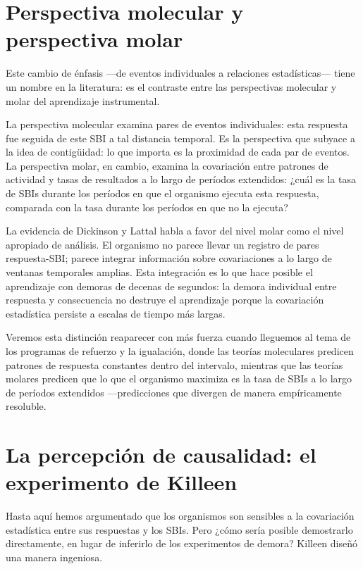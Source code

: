 \documentclass[
  letterpaper,
  DIV=11,
  numbers=noendperiod]{scrreprt}
\begin{document}
\begin{tcolorbox}[enhanced jigsaw, toprule=.15mm, arc=.35mm, colback=white, opacityback=0, colframe=quarto-callout-note-color-frame, breakable, rightrule=.15mm, left=2mm, leftrule=.75mm, bottomrule=.15mm]
\section{Perspectiva molecular y perspectiva
molar}\label{perspectiva-molecular-y-perspectiva-molar}

Este cambio de énfasis ---de eventos individuales a relaciones
estadísticas--- tiene un nombre en la literatura: es el contraste entre
las perspectivas molecular y molar del aprendizaje instrumental.

La perspectiva molecular examina pares de eventos individuales: esta
respuesta fue seguida de este SBI a tal distancia temporal. Es la
perspectiva que subyace a la idea de contigüidad: lo que importa es la
proximidad de cada par de eventos. La perspectiva molar, en cambio,
examina la covariación entre patrones de actividad y tasas de resultados
a lo largo de períodos extendidos: ¿cuál es la tasa de SBIs durante los
períodos en que el organismo ejecuta esta respuesta, comparada con la
tasa durante los períodos en que no la ejecuta?

La evidencia de Dickinson y Lattal habla a favor del nivel molar como el
nivel apropiado de análisis. El organismo no parece llevar un registro
de pares respuesta-SBI; parece integrar información sobre covariaciones
a lo largo de ventanas temporales amplias. Esta integración es lo que
hace posible el aprendizaje con demoras de decenas de segundos: la
demora individual entre respuesta y consecuencia no destruye el
aprendizaje porque la covariación estadística persiste a escalas de
tiempo más largas.

Veremos esta distinción reaparecer con más fuerza cuando lleguemos al
tema de los programas de refuerzo y la igualación, donde las teorías
moleculares predicen patrones de respuesta constantes dentro del
intervalo, mientras que las teorías molares predicen que lo que el
organismo maximiza es la tasa de SBIs a lo largo de períodos extendidos
---predicciones que divergen de manera empíricamente resoluble.

\section{La percepción de causalidad: el experimento de
Killeen}\label{la-percepciuxf3n-de-causalidad-el-experimento-de-killeen}

Hasta aquí hemos argumentado que los organismos son sensibles a la
covariación estadística entre sus respuestas y los SBIs. Pero ¿cómo
sería posible demostrarlo directamente, en lugar de inferirlo de los
experimentos de demora? Killeen diseñó una manera ingeniosa.


\end{tcolorbox}
\end{document}
